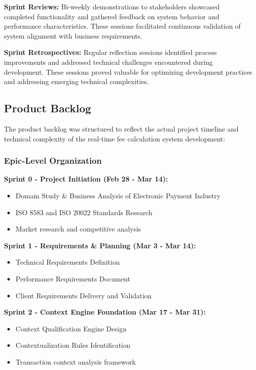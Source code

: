 \textbf{Sprint Reviews:} Bi-weekly demonstrations to stakeholders showcased completed functionality and gathered feedback on system behavior and performance characteristics. These sessions facilitated continuous validation of system alignment with business requirements.

\textbf{Sprint Retrospectives:} Regular reflection sessions identified process improvements and addressed technical challenges encountered during development. These sessions proved valuable for optimizing development practices and addressing emerging technical complexities.

\subsection{Product Backlog}

The product backlog was structured to reflect the actual project timeline and technical complexity of the real-time fee calculation system development:

\subsubsection{Epic-Level Organization}

\textbf{Sprint 0 - Project Initiation (Feb 28 - Mar 14):}
\begin{itemize}
    \item Domain Study \& Business Analysis of Electronic Payment Industry
    \item ISO 8583 and ISO 20022 Standards Research
    \item Market research and competitive analysis
\end{itemize}

\textbf{Sprint 1 - Requirements \& Planning (Mar 3 - Mar 14):}
\begin{itemize}
    \item Technical Requirements Definition
    \item Performance Requirements Document
    \item Client Requirements Delivery and Validation
\end{itemize}

\textbf{Sprint 2 - Context Engine Foundation (Mar 17 - Mar 31):}
\begin{itemize}
    \item Context Qualification Engine Design
    \item Contextualization Rules Identification
    \item Transaction context analysis framework
\end{itemize}


